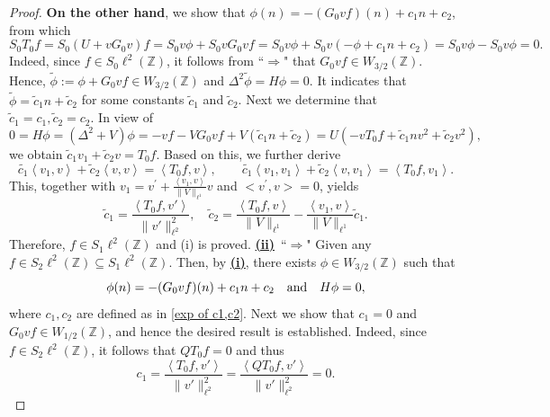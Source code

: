 \documentclass[reqno, 11pt]{amsart}
\newcommand\Z{\mathbb{Z}}
\numberwithin{equation}{section}
\begin{document}
\begin{proof}
\textbf{On the other hand}, we show that $\phi(n)=-(G_0vf)(n)+c_1n+c_2$, from which
$$S_0T_0f=S_0(U+vG_0v)f=S_0v\phi+S_0vG_0vf=S_0v\phi+S_0v(-\phi +c_1n+c_2)=S_0v\phi-S_0v\phi=0.$$
Indeed, since $f\in S_0\ell^2(\Z)$, it follows from ``$\bm{\Longrightarrow}$" that $G_0vf\in W_{3/2}(\Z)$. Hence, $\tilde{\phi}:=\phi+G_0vf\in W_{3/2}(\Z)$ and $\Delta^2\tilde{\phi}=H\phi=0$. It indicates that $\tilde{\phi}=\tilde{c}_{1}n+\tilde{c}_{2}$ for some constants $\tilde{c}_1$ and $\tilde{c}_2$. Next we determine that $\tilde{c}_1=c_1,\tilde{c}_2=c_2$. In view of
$$0=H\phi=(\Delta^2+V)\phi=-vf-VG_0vf+V(\tilde{c}_{1}n+\tilde{c}_{2})=U(-vT_0f+\tilde{c}_1nv^2+\tilde{c}_2v^2),$$
we obtain $\tilde{c}_1v_1+\tilde{c}_2v=T_0f$. Based on this, we further derive
\begin{equation}
\tilde{c_1}\left<v_1,v\right>+\tilde{c}_2\left<v,v\right>=\left<T_0f,v\right>,\qquad 
\tilde{c_1}\left<v_1,v_1\right>+\tilde{c}_2\left<v,v_1\right>=\left<T_0f,v_1\right>.
\end{equation}
This, together with $v_1=v^{'}+\frac{\left<v_1,v\right>}{\|V\|_{\ell^1}}v$ and $\big<v^{'},v\big>=0$, yields
$$ \tilde{c}_1=\frac{\left<T_0f,v'\right>}{\|v'\|^2_{\ell^2}},\quad \tilde{c}_2=\frac{\left<T_0f,v\right>}{\|V\|_{\ell^1}}-\frac{\left<v_1,v\right>}{\|V\|_{\ell^1}}\tilde{c}_1.$$
Therefore, $f\in S_1\ell^2(\Z)$ and (i) is proved.
\vskip0.1cm
{\bf{\underline{(ii)}}}~``$\bm{\Longrightarrow}$" Given any $f\in S_{2}\ell^2(\Z)\subseteq S_{1}\ell^2(\Z)$. Then, by {\bf{\underline{(i)}}}, there exists $\phi\in W_{3/2}(\Z)$ such that
$$\phi(n)=-(G_0vf)(n)+c_1n+c_2\quad {\rm and} \quad  H\phi=0,$$
where $c_1,c_2$ are defined as in \eqref{exp of c1,c2}. Next we show that $c_1=0$ and $G_0vf\in W_{1/2}(\Z)$, and hence the desired result is established. Indeed, since $f\in S_2\ell^2(\Z)$, it follows that $QT_0f=0$ and thus
$$c_1=\frac{\left<T_0f,v'\right>}{\|v'\|^2_{\ell^2}}=\frac{\left<QT_0f,v'\right>}{\|v'\|^2_{\ell^2}}=0.$$


\end{proof}
\end{document}
